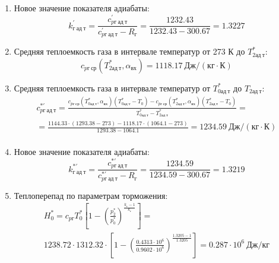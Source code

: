 \documentclass[a4paper,12pt]{article}
\begin{document}
\begin{enumerate}
        \item Новое значение показателя адиабаты:
        \[
            k_{г\ ад\ т}^\prime = \frac{c_{pг\ ад\ т}^\prime}{c_{pг\ ад\ т}^\prime - R_г} =
                \frac{
                    1232.43
                }{
                    1232.43 - 300.67
                }
            = 1.3227
        \]

        \item Средняя теплоемкость газа в интервале температур от 273 К до $T_{2ад\ т}^*$:
        \[
            c_{pг\ ср} (T_{2ад\ т}^*, \alpha_{вх}) =
            1118.17 \ Дж/(кг \cdot К)
        \]

        \item Средняя теплоемкость газа в интервале температур от $T_{0ад\ т}^*$ до $T_{2ад\ т}$:
        \begin{gather*}
            c_{pг\ ад\ т}^{*\prime} = \frac{
		        c_{pг\ ср}(T_{0ад\ т}^*, \alpha_{вх}) (T_{0ад\ т}^* - T_0) - c_{pг\ ср}(T_{2ад\ т}^*, \alpha_{вх}) (T_{2ад\ т}^* - T_0)
		    }{
		        T_{0ад\ т}^* - T_{2ад\ т}^*} =\\
            =\frac{
		        1144.33 \cdot
                (1293.38 - 273) -
		        1118.17 \cdot
                (1064.1 - 273)
		    }{
		        1293.38 - 1064.1} =
		    1234.59 \ Дж / (кг \cdot К)\\
        \end{gather*}

        \item Новое значение показателя адиабаты:
        \[
            k_{г\ ад\ т}^{*\prime} = \frac{c_{pг\ ад\ т}^{*\prime}}{c_{pг\ ад\ т}^{*\prime} - R_г} =
                \frac{
                    1234.59
                }{
                    1234.59 - 300.67
                }
            = 1.3219
        \]

        \item Теплоперепад по параметрам торможения:
        \begin{gather*}
            H_0^* = c_{pг} T_0^* \left[
                        1 - \left(
                                \frac{p_2^*}{p_0^*}
                            \right) ^
                        \frac{k_г - 1}{k_г}
                    \right] =\\
            1238.72 \cdot 1312.32 \cdot
                    \left[
                        1 - \left(
                                \frac{
                                    0.4313 \cdot 10^6
                                }{
                                    0.9602 \cdot 10^6
                                }
                            \right) ^
                        \frac{1.3205 - 1}{1.3205}
                    \right]
            = 0.287 \cdot 10^6 \ Дж/кг\\
        \end{gather*}


\end{enumerate}
\end{document}

